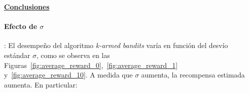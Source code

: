 \documentclass[12pt]{article}
\begin{document}
%
%
%
%
%
%
%
%

    \underline{\textbf{Conclusiones}}\\

    \paragraph{Efecto de $\sigma$}:
    El desempeño del algoritmo \textit{k-armed bandits} varía en función del desvío estándar $\sigma$, como se observa en las Figuras~\ref{fig:average_reward_0},~\ref{fig:average_reward_1} y~\ref{fig:average_reward_10}.
    A medida que $\sigma$ aumenta, la recompensa estimada aumenta.
    En particular:
\end{document}
